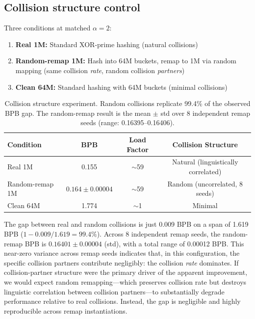 \documentclass[11pt]{article}
\begin{document}
\subsection{Collision structure control}

Three conditions at matched $\alpha = 2$:
\begin{enumerate}
\item \textbf{Real 1M:} Standard XOR-prime hashing (natural collisions)
\item \textbf{Random-remap 1M:} Hash into 64M buckets, remap to 1M via random mapping (same collision \emph{rate}, random collision \emph{partners})
\item \textbf{Clean 64M:} Standard hashing with 64M buckets (minimal collisions)
\end{enumerate}

\begin{table}[h]
\centering
\caption{Collision structure experiment. Random collisions replicate 99.4\% of the observed BPB gap. The random-remap result is the mean $\pm$ std over 8 independent remap seeds (range: 0.16395--0.16406).}
\label{tab:exp3}
\begin{tabular}{lccc}
\toprule
Condition & BPB & Load Factor & Collision Structure \\
\midrule
Real 1M & 0.155 & $\sim$59 & Natural (linguistically correlated) \\
Random-remap 1M & $0.164 \pm 0.00004$ & $\sim$59 & Random (uncorrelated, 8 seeds) \\
Clean 64M & 1.774 & $\sim$1 & Minimal \\
\bottomrule
\end{tabular}
\end{table}

The gap between real and random collisions is just 0.009 BPB on a span of 1.619 BPB ($1 - 0.009/1.619 = 99.4\%$). Across 8 independent remap seeds, the random-remap BPB is $0.16401 \pm 0.00004$ (std), with a total range of 0.00012 BPB. This near-zero variance across remap seeds indicates that, in this configuration, the specific collision partners contribute negligibly: the collision \emph{rate} dominates. If collision-partner structure were the primary driver of the apparent improvement, we would expect random remapping---which preserves collision rate but destroys linguistic correlation between collision partners---to substantially degrade performance relative to real collisions. Instead, the gap is negligible and highly reproducible across remap instantiations.
\end{document}

